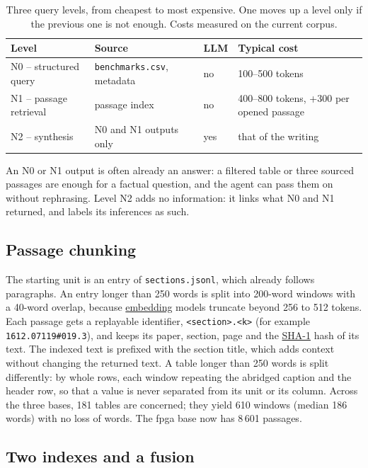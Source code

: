 \documentclass[11pt,a4paper]{article}
\newcommand{\cmd}[1]{\texttt{#1}}
\newcommand{\gl}[2]{\hyperlink{gl:#1}{\textcolor{glcolor}{#2}}}
\begin{document}
\begin{table}[ht]
\centering
\caption{Three query levels, from cheapest to most expensive. One moves up a level only if
the previous one is not enough. Costs measured on the current corpus.}
\label{tab:niveaux}
\small
\begin{tabularx}{\linewidth}{@{}lllL@{}}
\toprule
Level & Source & LLM & Typical cost \\
\midrule
N0 -- structured query & \cmd{benchmarks.csv}, metadata & no & 100--500 tokens \\
N1 -- passage retrieval & passage index & no & 400--800 tokens, +300 per opened passage \\
N2 -- synthesis & N0 and N1 outputs only & yes & that of the writing \\
\bottomrule
\end{tabularx}
\end{table}

An N0 or N1 output is often already an answer: a filtered table or three sourced passages
are enough for a factual question, and the agent can pass them on without rephrasing. Level
N2 adds no information: it links what N0 and N1 returned, and labels its inferences as such.

\subsection{Passage chunking}

The starting unit is an entry of \cmd{sections.jsonl}, which already follows paragraphs. An
entry longer than 250 words is split into 200-word windows with a 40-word overlap, because
\gl{embedding}{embedding} models truncate beyond 256 to 512 tokens. Each passage gets a replayable
identifier, \cmd{<section>.<k>} (for example \cmd{1612.07119\#019.3}), and keeps its paper,
section, page and the \gl{SHA}{SHA-1} hash of its text. The indexed text is prefixed with the section
title, which adds context without changing the returned text. A table longer than 250 words
is split differently: by whole rows, each window repeating the abridged caption and the header
row, so that a value is never separated from its unit or its column. Across the three bases,
181 tables are concerned; they yield 610 windows (median 186 words) with no loss of words.
The fpga base now has 8\,601 passages.

\subsection{Two indexes and a fusion}
\end{document}
